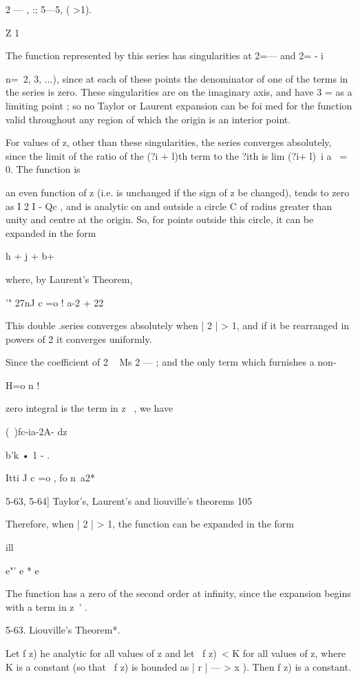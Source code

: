{{{{2 — , :; 5—5, ( >1). 

Z 1 

The function represented by this series has singularities at 2=— and 2= - i 

 n=\, 2, 3, ...), since at each of these points the denominator of one of the terms in the 
series is zero. These singularities are on the imaginary axis, and have 3 = as a limiting 
point ; so no Taylor or Laurent expansion can be foi med for the function valid throughout 
any region of which the origin is an interior point. 

For values of z, other than these singularities, the series converges absolutely, since the 
limit of the ratio of the (?i + l)th term to the ?ith is lim (?i+ l)~i a~  = 0. The function is 

an even function of z (i.e. is unchanged if the sign of z be changed), tends to zero as 
I 2 I -  Qc , and is analytic on and outside a circle C of radius greater than unity and centre 
at the origin. So, for points outside this circle, it can be expanded in the form 

h +  j + b+ 

where, by Laurent's Theorem, 

'" 27nJ c  =o ! a-2  + 22 

This double .series converges absolutely when | 2 | > 1, and if it be rearranged in powers 
of 2 it converges uniformly. 

Since the coefficient of 2 ~ Ms 2 — ; and the only term which furnishes a non- 

H=o n ! 

zero integral is the term in z~ , we have 

(\ )fc-ia-2A-  dz 



b'k   • 1 - . 



Itti J c  =o 
, fo n\ a2*  



5-63, 5-64] Taylor's, Laurent's and liouville's theorems 105 

Therefore, when | 2 | > 1, the function can be expanded in the form 

ill 

e"'  e * e   

The function has a zero of the second order at infinity, since the expansion begins with 
a term in z~' . 

5-63. Liouville's Theorem*. 

Let f z) he analytic for all values of z and let \ f z)\ < K for all values 
of z, where K is a constant (so that \ f z) is hounded as |  r | — > x ). Then 
f z) is a constant. 

}}}}
